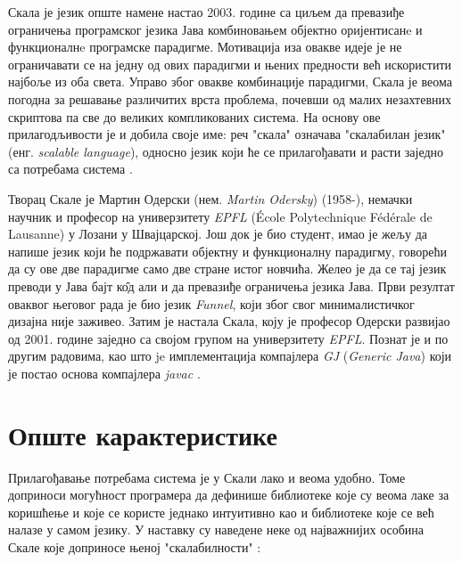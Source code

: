 \documentclass[12pt,oneside]{memoir}
\begin{document}
Скала је језик опште намене настао 2003. године са циљем да превазиђе ограничења програмског језика Јава комбиновањем објектно оријентисанe и функционалнe програмске парадигме. Мотивација иза овакве идеје је не ограничавати се на једну од ових парадигми и њених предности већ искористити најбоље из оба света. Управо због овакве комбинације парадигми, Скала је веома погодна за решавање различитих врста проблема, почевши од малих незахтевних скриптова па све до великих компликованих система. На основу ове прилагодљивости је и добила своје име: реч "скала" означава "скалабилан језик" (енг. \textit{scalable language}), односно језик који ће се прилагођавати и расти заједно са потребама система \cite{progInScala}.
\par Творац Скале је Мартин Одерски (нем. \textit{Martin Odersky}) (1958-), немачки научник и професор на универзитету \textit{EPFL} (École Polytechnique Fédérale de Lausanne) у Лозани у Швајцарској. Још док је био студент, имао је жељу да напише језик који ће подржавати објектну и функционалну парадигму, говорећи да су ове две парадигме само две стране истог новчића. Желео је да се тај језик преводи у Јава бајт к\^{о}д али и да превазиђе ограничења језика Јава. Први резултат оваквог његовог рада је био језик \textit{Funnel}, који због свог минималистичког дизајна није заживео. Затим је настала Скала, коју је професор Одерски развијао од 2001. године заједно са својом групом на универзитету \textit{EPFL}. Познат је и по другим радовима, као што je имплементација компајлера \textit{GJ} (\textit{Generic Java}) који је постао основа компајлера \textit{javac} \cite{MartinEpfl, ScalaHistory}.

\section{Опште карактеристике}
\label{sec:opsteKarakt}

Прилагођавање потребама система је у Скали лако и веома удобно. Томе доприноси могућност програмера да дефинише библиотеке које су веома лаке за коришћење и које се користе једнако интуитивно као и библиотеке које се већ налазе у самом језику. У наставку су наведене неке од најважнијих особина Скале које доприносе њеној "скалабилности" \cite{progInScala}:
\end{document}
